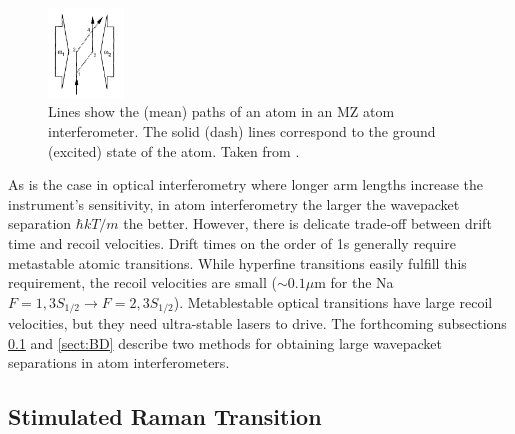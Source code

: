 \documentclass[reprint,
nofootinbib,
amsmath,amssymb,
aps]{revtex4-1}
\begin{document}
\begin{figure}
	\includegraphics[width=0.18\textwidth]{MZI.png}
	\caption{Lines show the (mean) paths of an atom in an MZ atom interferometer. The solid (dash) lines correspond to the ground (excited) state of the atom.  Taken from \cite{kasevich1992measurement}.}
	\label{fig:MZI}
\end{figure}


As is the case in optical interferometry where longer arm lengths increase the instrument's sensitivity, in atom interferometry the larger the wavepacket separation $\hbar k T /m$ the better. However, there is delicate trade-off between drift time and recoil velocities. Drift times on the order of 1s generally require metastable atomic transitions. While hyperfine transitions easily fulfill this requirement, the recoil velocities are small ($\sim 0.1 \mu\text{m}$ for the Na $F=1, 3S_{1/2}\to F=2,3S_{1/2}$). Metablestable optical transitions have large recoil velocities, but they need ultra-stable lasers to drive. The forthcoming subsections \ref{sect:SRT} and \ref{sect:BD} describe two methods for obtaining large wavepacket separations in atom interferometers. 



\subsection{Stimulated Raman Transition}\label{sect:SRT}
\end{document}
